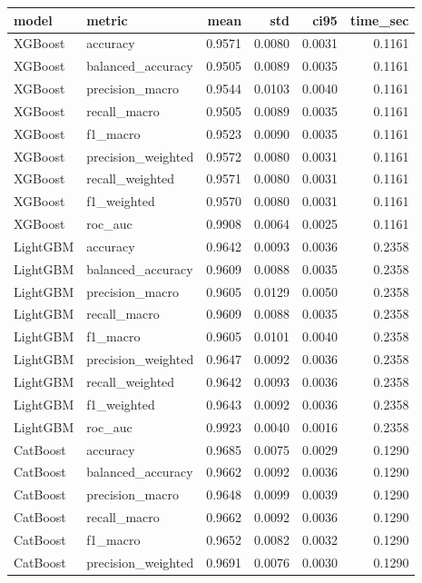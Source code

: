 \begin{tabular}{llrrrr}
\toprule
model & metric & mean & std & ci95 & time_sec \\
\midrule
XGBoost & accuracy & 0.9571 & 0.0080 & 0.0031 & 0.1161 \\
XGBoost & balanced_accuracy & 0.9505 & 0.0089 & 0.0035 & 0.1161 \\
XGBoost & precision_macro & 0.9544 & 0.0103 & 0.0040 & 0.1161 \\
XGBoost & recall_macro & 0.9505 & 0.0089 & 0.0035 & 0.1161 \\
XGBoost & f1_macro & 0.9523 & 0.0090 & 0.0035 & 0.1161 \\
XGBoost & precision_weighted & 0.9572 & 0.0080 & 0.0031 & 0.1161 \\
XGBoost & recall_weighted & 0.9571 & 0.0080 & 0.0031 & 0.1161 \\
XGBoost & f1_weighted & 0.9570 & 0.0080 & 0.0031 & 0.1161 \\
XGBoost & roc_auc & 0.9908 & 0.0064 & 0.0025 & 0.1161 \\
LightGBM & accuracy & 0.9642 & 0.0093 & 0.0036 & 0.2358 \\
LightGBM & balanced_accuracy & 0.9609 & 0.0088 & 0.0035 & 0.2358 \\
LightGBM & precision_macro & 0.9605 & 0.0129 & 0.0050 & 0.2358 \\
LightGBM & recall_macro & 0.9609 & 0.0088 & 0.0035 & 0.2358 \\
LightGBM & f1_macro & 0.9605 & 0.0101 & 0.0040 & 0.2358 \\
LightGBM & precision_weighted & 0.9647 & 0.0092 & 0.0036 & 0.2358 \\
LightGBM & recall_weighted & 0.9642 & 0.0093 & 0.0036 & 0.2358 \\
LightGBM & f1_weighted & 0.9643 & 0.0092 & 0.0036 & 0.2358 \\
LightGBM & roc_auc & 0.9923 & 0.0040 & 0.0016 & 0.2358 \\
CatBoost & accuracy & 0.9685 & 0.0075 & 0.0029 & 0.1290 \\
CatBoost & balanced_accuracy & 0.9662 & 0.0092 & 0.0036 & 0.1290 \\
CatBoost & precision_macro & 0.9648 & 0.0099 & 0.0039 & 0.1290 \\
CatBoost & recall_macro & 0.9662 & 0.0092 & 0.0036 & 0.1290 \\
CatBoost & f1_macro & 0.9652 & 0.0082 & 0.0032 & 0.1290 \\
CatBoost & precision_weighted & 0.9691 & 0.0076 & 0.0030 & 0.1290 \\

\end{tabular}
